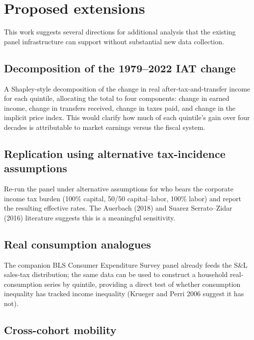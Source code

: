 \documentclass[11pt,letterpaper]{article}
\begin{document}
\section{Proposed extensions}

This work suggests several directions for additional analysis that the
existing panel infrastructure can support without substantial new data
collection.

\subsection{Decomposition of the 1979--2022 IAT change}

A Shapley-style decomposition of the change in real after-tax-and-transfer
income for each quintile, allocating the total to four components: change
in earned income, change in transfers received, change in taxes paid, and
change in the implicit price index. This would clarify how much of each
quintile's gain over four decades is attributable to market earnings versus
the fiscal system.

\subsection{Replication using alternative tax-incidence assumptions}

Re-run the panel under alternative assumptions for who bears the corporate
income tax burden (100\% capital, 50/50 capital--labor, 100\% labor) and
report the resulting effective rates. The Auerbach (2018) and Suarez
Serrato--Zidar (2016) literature suggests this is a meaningful sensitivity.

\subsection{Real consumption analogues}

The companion BLS Consumer Expenditure Survey panel already feeds the S\&L
sales-tax distribution; the same data can be used to construct a household
real-consumption series by quintile, providing a direct test of whether
consumption inequality has tracked income inequality (Krueger and Perri 2006
suggest it has not).

\subsection{Cross-cohort mobility}
\end{document}
